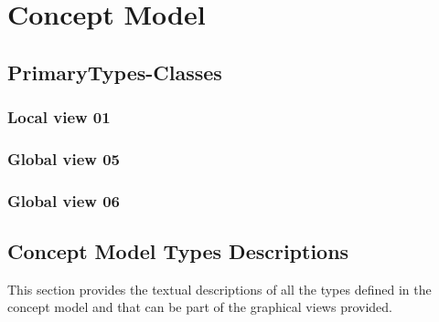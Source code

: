 
\chapter{Concept Model}
\label{chap:lu.uni.lassy.excalibur.MyCrash.G02-CM}


\section{PrimaryTypes-Classes}
\subsection{Local view 01}
\label{sec:lu.uni.lassy.excalibur.MyCrash.G02-CM-view-local-PrimaryTypes-Classes-01}


\subsection{Global view 05}
\label{sec:lu.uni.lassy.excalibur.MyCrash.G02-CM-view-global-PrimaryTypes-Classes-05}

\subsection{Global view 06}
\label{sec:lu.uni.lassy.excalibur.MyCrash.G02-CM-view-global-PrimaryTypes-Classes-06}











\section{Concept Model Types Descriptions}
This section provides the textual descriptions of all the types defined in the concept model and that can be part of the graphical views provided.












